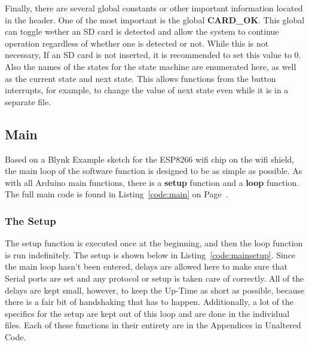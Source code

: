 \documentclass{article}
\begin{document}
Finally, there are several global constants or other important information located in the header. One of the most important is the global \textbf{CARD\_OK}. This global can toggle wether an SD card is detected and allow the system to continue operation regardless of whether one is detected or not. While this is not necessary, If an SD card is not inserted, it is recommended to set this value to 0. Also the names of the states for the state machine are enumerated here, as well as the current state and next state. This allows functions from the button interrupts, for example, to change the value of next state even while it is in a separate file.

\subsection{Main}
Based on a Blynk Example sketch for the ESP8266 wifi chip on the wifi shield, the main loop of the software function is designed to be as simple as possible. As with all Arduino main functions, there is a \textbf{setup} function and a \textbf{loop} function. The full main code is found in Listing~\ref{code:main} on Page~\pageref{code:main}. 


\subsubsection{The Setup}

The setup function is executed once at the beginning, and then the loop function is run indefinitely. The setup is shown below in Listing~\ref{code:mainsetup}. Since the main loop hasn't been entered, delays are allowed here to make sure that Serial ports are set and any protocol or setup is taken care of correctly. All of the delays are kept small, however, to keep the Up-Time as short as possible, because there is a fair bit of handshaking that has to happen. Additionally, a lot of the specifics for the setup are kept out of this loop and are done in the individual files. Each of these functions in their entirety are in the Appendices in Unaltered Code. 
\end{document}

